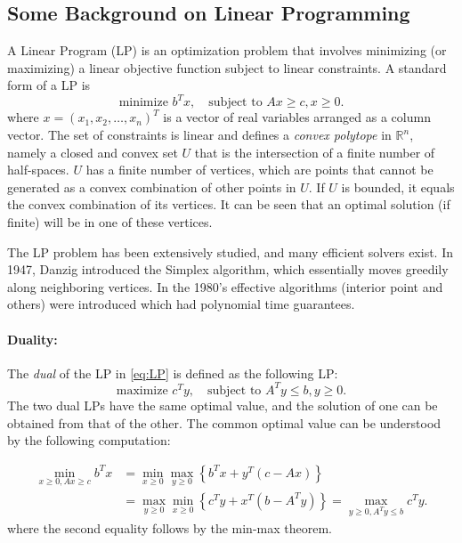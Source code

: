 \subsection{Some Background on Linear Programming}
A Linear Program (LP) is an optimization problem that involves minimizing (or maximizing) a linear objective function subject to linear constraints. A standard form of a LP is
\begin{equation}\label{eq:LP}
 \textrm{minimize } {b^T}x,   \quad \textrm{subject to } Ax \ge c,  x \ge 0.
\end{equation}
where $x = {({x_1},{x_2}, \ldots ,{x_n})^T}$ is a vector of real variables arranged as a column vector.
The set of constraints is linear and defines a \emph{convex polytope} in $\mathbb R^n$, namely a closed and convex set $U$ that is the intersection of a finite number of half-spaces. $U$ has a finite number of vertices, which are points that cannot be generated as a convex combination of other points in  $U$. If  $U$ is bounded, it equals the convex combination of its vertices. It can be seen that an optimal solution (if finite) will be in one of these vertices.

The LP problem has been extensively studied, and many efficient solvers exist. In 1947, Danzig introduced the Simplex algorithm, which essentially moves greedily along neighboring vertices.  In the 1980's effective algorithms (interior point and others) were introduced which had polynomial time guarantees.

\paragraph{Duality:} The \emph{dual} of the LP in \eqref{eq:LP} is defined as the following LP:
\begin{equation}\label{eq:LP_dual}
\textrm{maximize } {c^T}y,   \quad \textrm{subject to } {A^T}y \le b,  y \ge 0.
\end{equation}
The two dual LPs have the same optimal value, and the solution of one can be obtained from that of the other. The common optimal value can be understood by the following computation:

\begin{align*}
\mathop {\min }\limits_{x \ge 0,Ax \ge c} {b^T}x &= \mathop {\min }\limits_{x \ge 0} \mathop {\max }\limits_{y \ge 0} \left\{ {{b^T}x + {y^T}(c - Ax)} \right\}\\
 &= \mathop {\max }\limits_{y \ge 0} \mathop {\min }\limits_{x \ge 0} \left\{ {{c^T}y + {x^T}(b - {A^T}y)} \right\} = \mathop {\max }\limits_{y \ge 0,{A^T}y \le b} {c^T}y.
\end{align*}
where the second equality follows by the min-max theorem.

